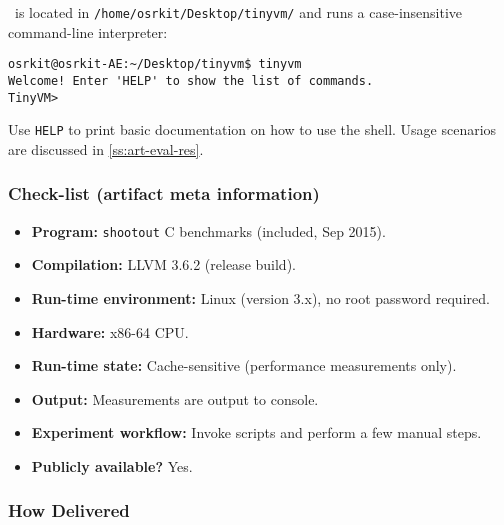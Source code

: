 \tinyvm\ is located in {\small\tt /home/osrkit/Desktop/tinyvm/} and runs a case-insensitive command-line interpreter:
\begin{small}
\begin{verbatim}
osrkit@osrkit-AE:~/Desktop/tinyvm$ tinyvm
Welcome! Enter 'HELP' to show the list of commands.
TinyVM> 
\end{verbatim}
\end{small}

\noindent Use {\tt HELP} to print basic documentation on how to use the shell. Usage scenarios are discussed in \ref{ss:art-eval-res}.

\subsubsection{Check-list (artifact meta information)}


{\small
\begin{itemize}[parsep=0pt]
  \item {\bf Program: } {\tt shootout} C benchmarks (included, Sep 2015). %
  \item {\bf Compilation: } LLVM 3.6.2 (release build).
  \item {\bf Run-time environment: } Linux (version 3.x), no root password required.
  \item {\bf Hardware: } x86-64 CPU.
  \item {\bf Run-time state: } Cache-sensitive (performance measurements only).
  \item {\bf Output: } Measurements are output to console.
  \item {\bf Experiment workflow: } Invoke scripts and perform a few manual steps.
  \item {\bf Publicly available?} Yes.
\end{itemize}
}

\subsubsection{How Delivered}

